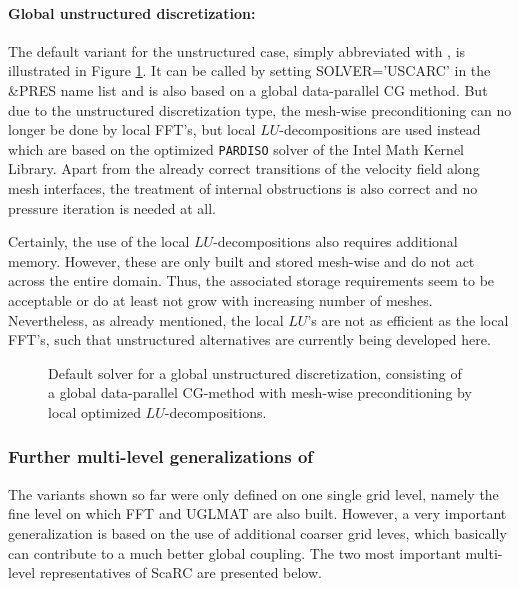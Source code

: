 {\paragraph{Global unstructured discretization:}
The default variant for the unstructured case, simply abbreviated with \uscarc{}, is illustrated in Figure 
\ref{FIG_default_uscarc}. It can be called by setting {\ct SOLVER='USCARC'} in the {\ct \&PRES} name list
and is also based on a global data-parallel CG method. 
%
But due to the unstructured discretization type, the 
mesh-wise preconditioning can no longer be done by local FFT's, but local $LU$-decompositions are used instead which are based on the optimized {\tt PARDISO} solver of the Intel\textsuperscript{\textregistered} Math Kernel Library. Apart from the already correct transitions of the velocity field along mesh interfaces, the treatment of internal obstructions is also correct and no pressure iteration is needed at all.

Certainly, the use of the local $LU$-decompositions also requires additional memory.
However, these are only built and stored mesh-wise and do not act across the entire domain. Thus, the associated storage requirements seem to be acceptable or do at least not grow with increasing number of meshes. Nevertheless, as already mentioned, the local $LU$'s are not as efficient as the local FFT's, such that unstructured alternatives are currently being developed here.

\begin{figure}[h]
\begin{center}

\caption{Default \uscarc{} solver for a global unstructured discretization, consisting of a global data-parallel CG-method with mesh-wise preconditioning by local optimized $LU$-decompositions.} 
\label{FIG_default_uscarc}
\end{center}
\end{figure}

\subsubsection{Further multi-level generalizations of \scarc{}}
The \scarc{} variants shown so far were only defined on one single grid level, namely the fine level on which FFT and UGLMAT  are also built. However, a very important generalization is based on the use of additional coarser grid leves, which basically can contribute to a much better global coupling. The two most important multi-level representatives of ScaRC are presented below.

}
